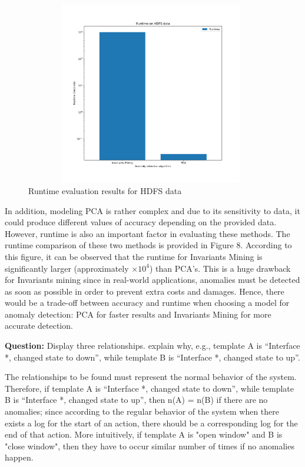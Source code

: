 \documentclass[12pt,a4paper]{article}
\begin{document}
	\vspace{-0.3cm}
	\begin{figure}[H]
		\centering
		\includegraphics[width=11cm, height=8cm]{Figures/Runtime_2}
		\vspace{-0.8cm}
		
		\caption{Runtime evaluation results for HDFS data}
	\end{figure}
	
	\noindent In addition, modeling PCA is rather complex and due to its sensitivity to data, it could produce different values of accuracy depending on the provided data. However, runtime is also an important factor in evaluating these methods. The runtime comparison of these two methods is provided in Figure 8. According to this figure, it can be observed that the runtime for Invariants Mining is significantly larger (approximately $\times 10^4$) than PCA's. This is a huge drawback for Invariants mining since in real-world applications, anomalies must be detected as soon as possible in order to prevent extra costs and damages. Hence, there would be a trade-off between accuracy and runtime when choosing a model for anomaly detection: PCA for faster results and Invariants Mining for more accurate detection.
	
	\vspace{0.3cm}
	\noindent \textbf{Question:} Display three relationships. explain why, e.g., template A is “Interface *, changed state to down”, while template B is “Interface *, changed state to up”.
	
	\vspace{0.2cm}
	
	\noindent The relationships to be found must represent the normal behavior of the system. Therefore, if template A is “Interface *, changed state to down”, while template B is “Interface *, changed state to up”, then n(A) = n(B) if there are no anomalies; since according to the regular behavior of the system when there exists a log for the start of an action, there should be a corresponding log for the end of that action. More intuitively, if template A is "open window" and B is "close window", then they have to occur similar number of times if no anomalies happen. 
	
\end{document}
